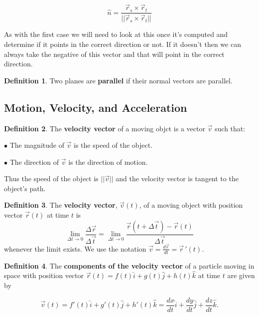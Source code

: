 \documentclass[12pt, a4paper]{article}
\theoremstyle{plain}
\theoremstyle{definition}
\newtheorem{definition}{Definition}[section]
\theoremstyle{remark}
\begin{document}
$$\hat{n} = \frac{\vec{r}_s \times \vec{r}_t}{|| \vec{r}_s \times \vec{r}_t ||} $$

As with the first case we will need to look at this once it’s computed and determine if it points in the correct direction or not.  If it doesn’t then we can always take the negative of this vector and that will point in the correct direction.

\vspace{.05in}

\begin{definition}
Two planes are \textbf{parallel} if their normal vectors are parallel.
\end{definition}












\subsection{Motion, Velocity, and Acceleration}

\begin{definition}
The \textbf{velocity vector} of a moving objct is a vector $\vec{v}$ such that:

$\bullet$ The magnitude of $\vec{v}$ is the speed of the object.

$\bullet$ The direction of $\vec{v}$ is the direction of motion.

Thus the speed of the object is $||\vec{v}||$ and the velocity vector is tangent to the object's path.
\end{definition}

\begin{definition}
The \textbf{velocity vector}, $\vec{v}(t)$, of a moving object with position vector $\vec{r}(t)$ at time $t$ is 
$$ \lim_{\Delta t \to 0} \frac{\Delta \vec{r}}{\Delta \vec{t}} = \lim_{\Delta t \to 0} \frac{\vec{r}( t + \Delta \vec{t})-\vec{r}(t)}{\Delta \vec{t}} $$
whenever the limit exists. We use the notation $\vec{v} = \frac{d\vec{r}}{dt} = \vec{r} \, '(t)$.
\end{definition}

\begin{definition}
The \textbf{components of the velocity vector} of a particle moving in space with position vector $\vec{r}(t) = f(t) \hat{i} + g(t) \hat{j} + h(t) \hat{k}$ at time $t$ are given by 

$$\vec{v}(t) = f'(t) \hat{i} + g'(t) \hat{j} + h'(t) \hat{k} = \frac{dx}{dt} \hat{i} + \frac{dy}{dt} \hat{j} + \frac{dz}{dt} \hat{k}. $$
\end{definition}
\end{document}
